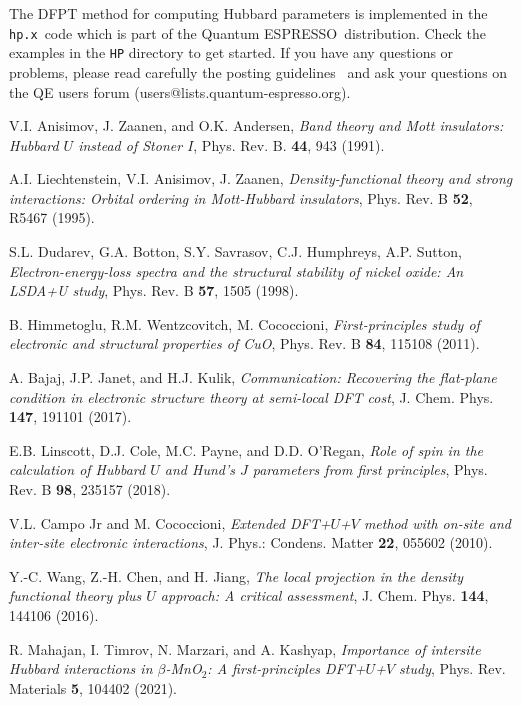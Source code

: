 \documentclass[12pt,a4paper]{article}
\def\qe{{\sc Quantum ESPRESSO}}
\def\hp{\texttt{hp.x}}
\begin{document}
The DFPT method for computing Hubbard parameters is implemented in the \hp\ code which is part of the \qe\ distribution. Check the examples in the \texttt{HP} directory to get started. If you have any questions or problems, please read carefully the posting guidelines~\cite{QE} and ask your questions on the QE users forum (users@lists.quantum-espresso.org). 

  
\begin{thebibliography}{100}
  
   V.I. Anisimov, J. Zaanen, and O.K. Andersen, \textit{Band theory and Mott insulators: Hubbard $U$ instead of Stoner $I$}, Phys. Rev. B. {\bf 44}, 943 (1991).
  
   A.I. Liechtenstein, V.I. Anisimov, J. Zaanen, \textit{Density-functional theory and strong interactions: Orbital ordering in Mott-Hubbard insulators}, Phys. Rev. B {\bf 52}, R5467 (1995).
  
   S.L. Dudarev, G.A. Botton, S.Y. Savrasov, C.J. Humphreys, A.P. Sutton, \textit{Electron-energy-loss spectra and the structural stability of nickel oxide: An LSDA+U study}, Phys. Rev. B {\bf 57}, 1505 (1998).
  
   B. Himmetoglu, R.M. Wentzcovitch, M. Cococcioni, \textit{First-principles study of electronic and structural properties of CuO}, Phys. Rev. B {\bf 84}, 115108 (2011). 
  
   A. Bajaj, J.P. Janet, and H.J. Kulik, \textit{Communication: Recovering the flat-plane condition in electronic structure theory at semi-local DFT cost}, J. Chem. Phys. {\bf 147}, 191101 (2017).
  
   E.B. Linscott, D.J. Cole, M.C. Payne, and D.D. O'Regan, \textit{Role of spin in the calculation of Hubbard $U$ and Hund's $J$ parameters from first principles}, Phys. Rev. B {\bf 98}, 235157 (2018).
  
   V.L. Campo Jr and M. Cococcioni, \textit{Extended DFT+$U$+$V$ method with on-site and inter-site electronic interactions}, J. Phys.: Condens. Matter {\bf 22}, 055602 (2010).
  
   Y.-C. Wang, Z.-H. Chen, and H. Jiang, \textit{The local projection in the density functional theory plus $U$ approach: A critical assessment}, J. Chem. Phys. {\bf 144}, 144106 (2016).
  
   R. Mahajan, I. Timrov, N. Marzari, and A. Kashyap, \textit{Importance of intersite Hubbard interactions in $\beta$-MnO$_2$: A first-principles DFT+$U$+$V$ study}, Phys. Rev. Materials {\bf 5}, 104402 (2021).
  

\end{thebibliography}
\end{document}
